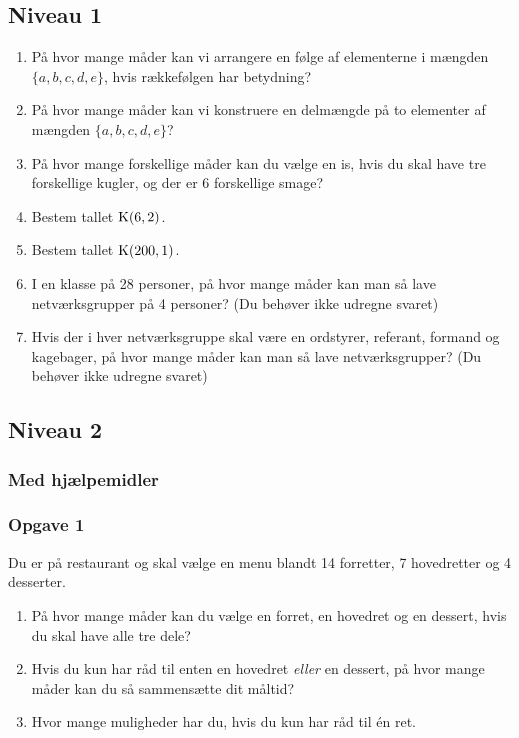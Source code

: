 \documentclass[12pt]{article}
\begin{document}
\subsection*{Niveau 1}

\begin{enumerate}[label=\roman*)]
	\item På hvor mange måder kan vi arrangere en følge af elementerne i mængden $\{a,b,c,d,e\}$, hvis rækkefølgen har betydning?
	\item På hvor mange måder kan vi konstruere en delmængde på to elementer af mængden $\{a,b,c,d,e\}$?
	\item På hvor mange forskellige måder kan du vælge en is, hvis du skal have tre forskellige kugler, og der er 6 forskellige smage?
	\item Bestem tallet $\textnormal{K}(6,2)$.
	\item Bestem tallet $\textnormal{K}(200,1)$.
	\item I en klasse på 28 personer, på hvor mange måder kan man så lave netværksgrupper på 4 personer? (Du behøver ikke udregne svaret)
	\item Hvis der i hver netværksgruppe skal være en ordstyrer, referant, formand og kagebager, på hvor mange måder kan man så lave netværksgrupper? (Du behøver ikke udregne svaret)
\end{enumerate}

\subsection*{Niveau 2}

\subsubsection*{Med hjælpemidler}

\subsubsection*{Opgave 1}
Du er på restaurant og skal vælge en menu blandt 14 forretter, 7 hovedretter og 4 desserter.
\begin{enumerate}[label=\roman*)]
	\item På hvor mange måder kan du vælge en forret, en hovedret og en dessert, hvis du skal have alle tre dele?
	\item Hvis du kun har råd til enten en hovedret \textit{eller} en dessert, på hvor mange måder kan du så sammensætte dit måltid?
	\item Hvor mange muligheder har du, hvis du kun har råd til én ret. 
\end{enumerate}
\end{document}
